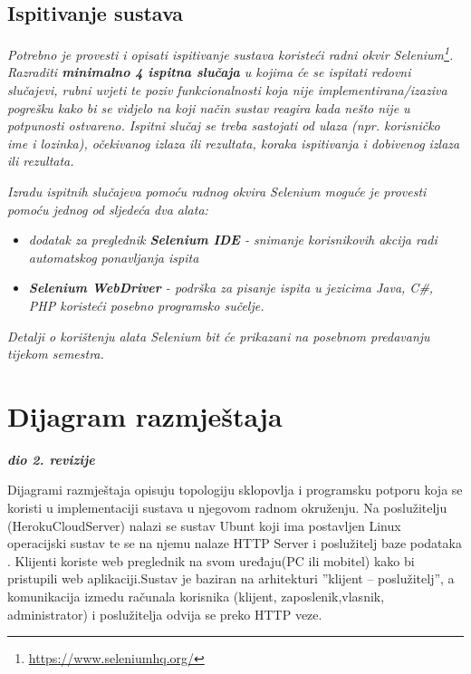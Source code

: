 			
			
			\subsection{Ispitivanje sustava}
			
			 \textit{Potrebno je provesti i opisati ispitivanje sustava koristeći radni okvir Selenium\footnote{\url{https://www.seleniumhq.org/}}. Razraditi \textbf{minimalno 4 ispitna slučaja} u kojima će se ispitati redovni slučajevi, rubni uvjeti te poziv funkcionalnosti koja nije implementirana/izaziva pogrešku kako bi se vidjelo na koji način sustav reagira kada nešto nije u potpunosti ostvareno. Ispitni slučaj se treba sastojati od ulaza (npr. korisničko ime i lozinka), očekivanog izlaza ili rezultata, koraka ispitivanja i dobivenog izlaza ili rezultata.\\ }
			 
			 \textit{Izradu ispitnih slučajeva pomoću radnog okvira Selenium moguće je provesti pomoću jednog od sljedeća dva alata:}
			 \begin{itemize}
			 	\item \textit{dodatak za preglednik \textbf{Selenium IDE} - snimanje korisnikovih akcija radi automatskog ponavljanja ispita	}
			 	\item \textit{\textbf{Selenium WebDriver} - podrška za pisanje ispita u jezicima Java, C\#, PHP koristeći posebno programsko sučelje.}
			 \end{itemize}
		 	\textit{Detalji o korištenju alata Selenium bit će prikazani na posebnom predavanju tijekom semestra.}
			
			\eject 
\section{Dijagram razmještaja}
	
	\textbf{\textit{dio 2. revizije}}
	
	\text Dijagrami razmještaja opisuju topologiju sklopovlja i programsku potporu koja se koristi u implementaciji sustava u njegovom radnom okruženju. Na poslužitelju
	(HerokuCloudServer) nalazi se sustav Ubunt koji ima postavljen Linux operacijski sustav te se na njemu nalaze HTTP Server i poslužitelj baze podataka . Klijenti koriste web preglednik na svom uređaju(PC ili mobitel) kako bi pristupili web aplikaciji.Sustav je baziran na arhitekturi ”klijent
    – poslužitelj”, a komunikacija izmedu računala korisnika (klijent, zaposlenik,vlasnik, administrator) i poslužitelja odvija se preko HTTP veze.  

